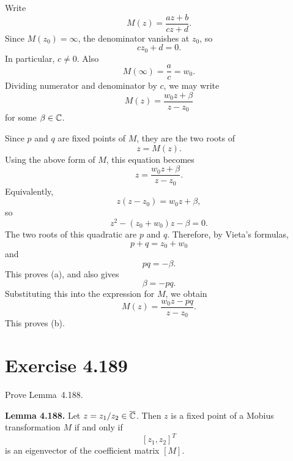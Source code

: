 \documentclass{article}
\providecommand{\Chat}{\overline{\C}}
\begin{document}
\begin{solution}
  Write
  \[
    M(z)=\frac{az+b}{cz+d}.
  \]
  Since $M(z_0)=\infty$, the denominator vanishes at $z_0$, so
  \[
    cz_0+d=0.
  \]
  In particular, $c\ne0$. Also
  \[
    M(\infty)=\frac ac=w_0.
  \]
  Dividing numerator and denominator by $c$, we may write
  \[
    M(z)=\frac{w_0z+\beta}{z-z_0}
  \]
  for some $\beta\in\mathbb{C}$.

  Since $p$ and $q$ are fixed points of $M$, they are the two roots of
  \[
    z=M(z).
  \]
  Using the above form of $M$, this equation becomes
  \[
    z=\frac{w_0z+\beta}{z-z_0}.
  \]
  Equivalently,
  \[
    z(z-z_0)=w_0z+\beta,
  \]
  so
  \[
    z^2-(z_0+w_0)z-\beta=0.
  \]
  The two roots of this quadratic are $p$ and $q$. Therefore, by Vieta's
  formulas,
  \[
    p+q=z_0+w_0
  \]
  and
  \[
    pq=-\beta.
  \]
  This proves (a), and also gives
  \[
    \beta=-pq.
  \]
  Substituting this into the expression for $M$, we obtain
  \[
    M(z)=\frac{w_0z-pq}{z-z_0}.
  \]
  This proves (b).
\end{solution}

\section{Exercise 4.189}

Prove Lemma~4.188.

\textbf{Lemma 4.188.}
Let $z=z_1/z_2\in\Chat$. Then $z$ is a fixed point of a Mobius
transformation $M$ if and only if
\[
  [z_1,z_2]^T
\]
is an eigenvector of the coefficient matrix $[M]$.
\end{document}
